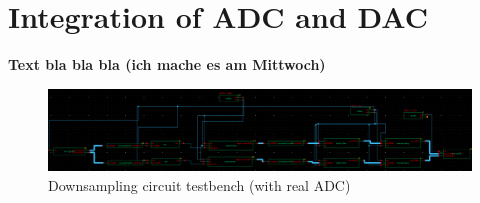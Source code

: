 

\section{Integration of ADC and DAC}

\textbf{Text bla bla bla (ich mache es am Mittwoch)}

\begin{figure}[!h]
	\centering 
	\includegraphics[scale=0.27]{images/DownsamplingCircuit/wav_downsampling.png}
	\caption{Downsampling circuit testbench (with real ADC)}
	\label{fig:downsamplingADCTestbench}
\end{figure}



